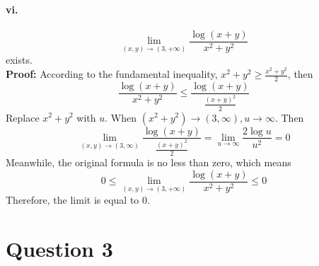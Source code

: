 \documentclass[11pt, a4paper]{article}
\begin{document}
\paragraph{vi.}
$$\lim_{(x, y) \to (3, +\infty)} \frac{\log(x + y)}{x ^ 2 + y ^ 2}$$ exists. \\
\textbf{Proof:} According to the fundamental inequality, $x ^ 2 + y ^ 2 \geq \frac{x ^ 2 + y ^ 2}{2}$, then
$$\frac{\log(x + y)}{x ^ 2 + y ^ 2} \leq \frac{\log(x + y)}{\frac{(x + y) ^ 2}{2}}$$
Replace $x ^ 2 + y ^ 2$ with $u$. When $(x ^ 2 + y ^ 2) \to (3, \infty), u \to \infty$. Then 
$$\lim_{(x, y) \to (3, \infty)} \frac{\log(x + y)}{\frac{(x + y) ^ 2}{2}} = \lim_{u \to \infty} \frac{2\log u}{u ^ 2} = 0$$
Meanwhile, the original formula is no less than zero, which means
$$0 \leq \lim_{(x, y) \to (3, +\infty)} \frac{\log(x + y)}{x ^ 2 + y ^ 2} \leq 0$$
Therefore, the limit is equal to 0.

\section*{Question 3}
\end{document}
